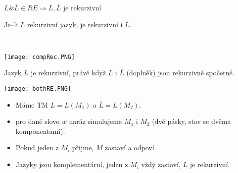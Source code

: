     \begin{frame}{$L \& \overline{L}\in RE \Rightarrow L, \overline{L}$ je rekurzivní}
    \begin{minipage}{0.55\textwidth}
    \begin{lemma}
    Je--li $L$ rekurzivní jazyk, je rekurzivní i $\bar{L}$.
    \end{lemma}
    \end{minipage}\pause
    \begin{minipage}{0.03\textwidth}
    \ \end{minipage}
    \begin{minipage}{0.4\textwidth}
    \texttt{[image: compRec.PNG]}
    \end{minipage}
    \begin{minipage}{0.55\textwidth}
    \begin{theorem}
    Jazyk $L$ je rekurzivní, právě když $L$ i $\overline{L}$ (doplněk) jsou rekurzivně spočetné.
    \end{theorem}
    \end{minipage}\hfill\pause
    \begin{minipage}{0.3\textwidth}
    \texttt{[image: bothRE.PNG]}
    \end{minipage}
    \begin{proofm}{}
    \begin{itemize}[<+->]
        \item Máme TM $L=L(M_1)$ a $\overline{L}=L(M_2)$.
        \item pro dané slovo $w$ naráz simulujeme $M_1$ i $M_2$ (dvě pásky, stav se dvěma komponentami).
        \item Pokud jeden z $M_i$ přijme, $M$ zastaví a odpoví.
        \item Jazyky jsou komplementární, jeden z $M_i$ vždy zastaví, $L$ je rekurzivní.
    \end{itemize}
    \end{proofm}
    \end{frame}
    
    
    
